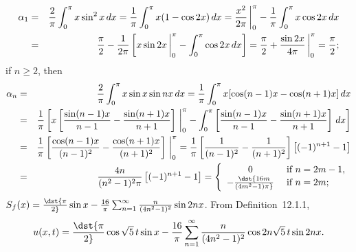 \documentclass[dvips]{book}
\renewcommand{\exer}[1]{\par\medskip\;\noindent{\color{red}\bf #1.}}
\numberwithin{example}{section}
\numberwithin{equation}{section}
\numberwithin{theorem}{section}
\numberwithin{table}{section}
\numberwithin{figure}{section}
\newcommand{\lims}[2]{\,\bigg|_{#1}^{#2}}
\begin{document}
\exer{12.2.10}
\begin{eqnarray*}
\alpha_1&=&{2\over\pi}\int_0^\pi x\sin^2 x\,dx=
{1\over \pi}\int_0^\pi x(1-\cos2x)\,dx
={x^2\over2\pi}\lims0\pi
-{1\over\pi}\int_0^\pi x\cos2x\,dx\\
&=&{\pi\over2}-{1\over2\pi}\left[x\sin2x\lims0\pi-\int_0^\pi
\cos2x\,dx\right]
={\pi\over2}+{\sin2x\over4\pi}\lims0\pi={\pi\over2};
\end{eqnarray*}
if $n\ge2$, then
\begin{eqnarray*}
\alpha_n&=&
{2\over\pi}\int_0^\pi x\sin x\sin nx\,dx
={1\over\pi}\int_0^\pi x[\cos(n-1)x-\cos(n+1)x]\,dx\\
&=&{1\over\pi}\left[x\left[{\sin(n-1)x\over n-1}-
{\sin(n+1)x\over n+1}\right]\lims0\pi-\int_0^\pi
\left[{\sin(n-1)x\over n-1}-{\sin(n+1)x\over n+1}\right]\,dx\right]\\
&=&{1\over\pi}\left[{\cos(n-1)x \over(n-1)^2}
-{\cos(n+1)x\over(n+1)^2}\right]\lims0\pi
={1\over\pi}\left[{1\over(n-1)^2}-{1\over(n+1)^2}\right]
\left[(-1)^{n+1}-1\right]\\
&=&{4n\over(n^2-1)^2\pi}\left[(-1)^{n+1}-1\right]=
\left\{\begin{array}{cl}
0& \mbox{ if }n=2m-1,\\
-\dst{16m\over(4m^2-1)\pi}&\mbox{ if }n=2m;
\end{array}\right.
\end{eqnarray*}
$S_f(x)=\dst{\pi\over2}\sin x-{16\over\pi}
\sum_{n=1}^\infty{n\over(4n^2-1)^2}\sin 2nx$.
From Definition~12.1.1,
$$
u(x,t)=\dst{\pi\over2}\cos\sqrt{5}\,t\sin x-{16\over\pi}
\sum_{n=1}^\infty{n\over(4n^2-1)^2}\cos2n\sqrt5\,t\sin 2nx.
$$
\end{document}

